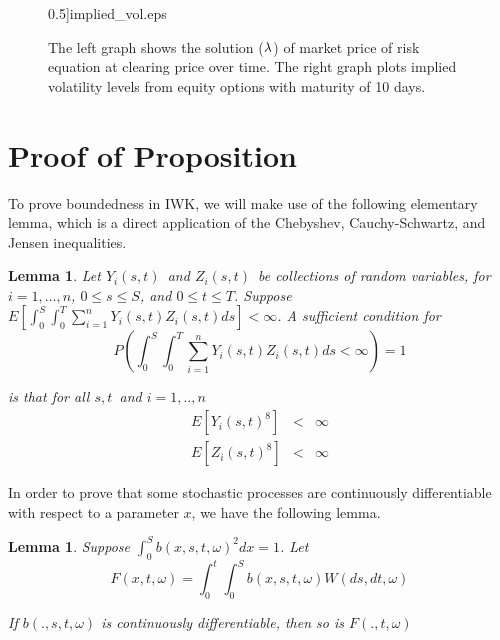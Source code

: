 \documentclass{article}
\newtheorem{lemma}[theorem]{Lemma}
\begin{document}
\begin{center}
\begin{figure}[tbp]
0.5]{implied_vol.eps}\newline
\caption{The left graph shows the solution ($\protect\lambda $) of market
price of risk equation at clearing price over time. The right graph plots
implied volatility levels from equity options with maturity of 10 days.}
\label{fig::Put_Option_Vols}
\end{figure}
\end{center}

\appendix
\section{Proof of Proposition}

To prove boundedness in IWK, we will make use of the following elementary
lemma, which is a direct application of the Chebyshev, Cauchy-Schwartz, and
Jensen inequalities.


\begin{lemma}\label{lemma::differentiable_F}
\textit{Let }$Y_{i}(s,t)$\textit{\ and }$Z_{i}(s,t)$\textit{\ be collections
of random variables, for }$i=1,...,n$\textit{, }$0\leq s\leq S$\textit{, and
}$0\leq t\leq T$\textit{. Suppose }$E[\int_{0}^{S}\int_{0}^{T}%
\sum_{i=1}^{n}Y_{i}(s,t)Z_{i}(s,t)ds]<\infty $\textit{. A sufficient
condition for }%
\begin{equation*}
P(\int_{0}^{S}\int_{0}^{T}\sum_{i=1}^{n}Y_{i}(s,t)Z_{i}(s,t)ds<\infty )=1
\end{equation*}

\textit{is that for all }$s,t$\textit{\ and }$i=1,..,n$%
\begin{eqnarray*}
E[Y_{i}(s,t)^{8}] &<&\infty \\
E[Z_{i}(s,t)^{8}] &<&\infty
\end{eqnarray*}
\end{lemma}

In order to prove that some stochastic processes are continuously
differentiable with respect to a parameter $x$, we have the following lemma.

\bigskip


\begin{lemma}\label{lemma::differentiable_F}
Suppose $\int_{0}^{S}b(x,s,t,\omega )^{2}dx=1$. Let
\begin{equation*}
F(x,t,\omega )=\int_{0}^{t}\int_{0}^{S}b(x,s,t,\omega )W(ds,dt,\omega )
\end{equation*}

If $b(.,s,t,\omega )$ is continuously differentiable, then so is $%
F(.,t,\omega )$
\end{lemma}
\end{document}

